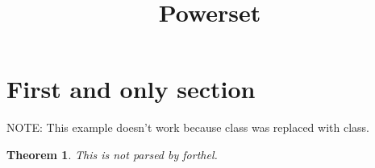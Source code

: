 \documentclass[a4paper,draft]{amsproc}
\title{\textbf{Powerset}}
\date{}
\begin{document}
\theoremstyle{plain}
 \newtheorem{theorem}{Theorem}[section]
 \newtheorem{proposition}{Proposition}[section]
 \newtheorem{lemma}{Lemma}[section]
 \newtheorem{corollary}{Corollary}[section]
 \newtheorem{axiom}{Axiom}[section]
\theoremstyle{definition}
 \newtheorem{example}{Example}[section]
 \newtheorem{definition}{Definition}[section]
\theoremstyle{remark}
 \newtheorem{remark}{Remark}[section]
 \newtheorem{notation}{Notation}[section]

\newenvironment{forthel}{}{}

\maketitle 
\section{First and only section}

NOTE: This example doesn't work because class was replaced with class.

\begin{theorem}
This is not parsed by forthel.
\end{theorem}
\end{document}
